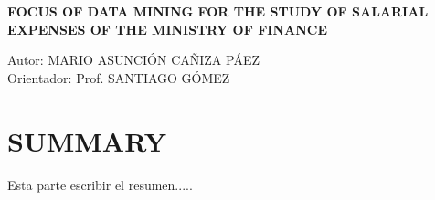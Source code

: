 \newpage
\section*{}
	 \textbf{FOCUS OF DATA MINING FOR THE STUDY OF SALARIAL EXPENSES OF THE MINISTRY OF FINANCE} \\
\begin{flushright}
	Autor: MARIO ASUNCI\'ON CAÑIZA P\'AEZ\\
    Orientador: Prof. SANTIAGO G\'OMEZ\\
\end{flushright}
\vspace{1,5cm}
\section*{SUMMARY}
Esta parte escribir el resumen.....
